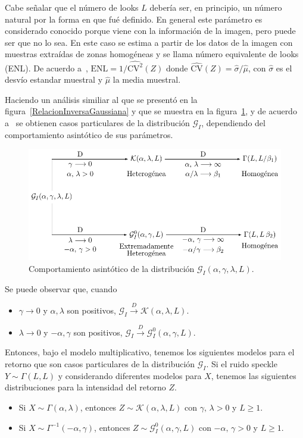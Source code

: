 Cabe señalar que el número de looks $L$ debería ser, en principio, un número natural por la forma en que fué definido. En general este parámetro es considerado conocido porque viene con la información de la imagen, pero puede ser que no lo sea. En este caso se estima a partir de los datos de la imagen con muestras extraídas de zonas homogéneas y se llama número equivalente de looks (ENL). De acuerdo a~\citet{anfinsen2009}, $\text{ENL}={1}/{\widehat{\text{CV}^2}(Z)}$ donde $\widehat{\text{CV}}(Z)={\widehat{\sigma}}/{\widehat\mu}$, con $\widehat{\sigma}$ es el desvío estandar muestral y $\widehat\mu$ la media muestral.

Haciendo un análisis similiar al que se presentó en la figura~\ref{RelacionInversaGaussiana} y que se muestra en la figura~\ref{RelacionGI}, y de acuerdo a~\citet{Frery99} se obtienen casos particulares de la distribución $\mathcal{G}_I$, dependiendo del comportamiento asintótico de sus parámetros.
\begin{figure}[hbt]
	\centering    
	\includegraphics[scale=1]{../../Figures/Tesis/Capitulo4/RelacionGI.pdf}
	\caption{\label{RelacionGI}Comportamiento asintótico de la distribución $\mathcal{G}_I(\alpha,\gamma,\lambda,L)$.} %
\end{figure} 

Se puede observar que, cuando 
\begin{itemize}
	\item $\gamma \longrightarrow 0$ y $\alpha,\lambda$ son positivos, $\mathcal{G}_I \stackrel{D}{\longrightarrow}\mathcal{K}(\alpha,\lambda,L)$.
	\item $\lambda \longrightarrow 0$ y $-\alpha,\gamma$ son positivos, $\mathcal{G}_I\stackrel{D}{\longrightarrow}\mathcal{G}_I^0(\alpha,\gamma,L)$.
\end{itemize}

Entonces, bajo el modelo multiplicativo, tenemos los siguientes modelos para el retorno que son casos particulares de la distribución $\mathcal{G}_I$. Si el ruido speckle $Y \sim \Gamma(L,L)$ y considerando diferentes modelos para $X$, tenemos las siguientes distribuciones para la intensidad del retorno $Z$.
\begin{itemize}
	\item Si $X \sim \Gamma(\alpha,\lambda)$, entonces $Z \sim \mathcal{K}(\alpha,\lambda,L)$ con $\gamma, \, \lambda >0$ y $L \geq 1$.
	\item Si $X \sim \Gamma^{-1}(-\alpha,\gamma)$, entonces $Z \sim \mathcal{G}_I^0(\alpha,\gamma,L)$ con $-\alpha, \, \gamma >0$ y $L \geq 1$.
\end{itemize}

